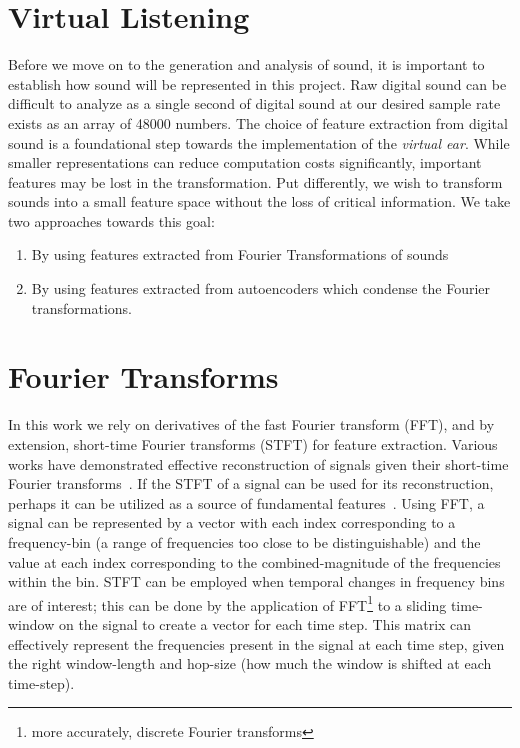 \documentclass[\main/thesis.tex]{subfiles}
\begin{document}
\section{Virtual Listening}
\label{chap:represent_sound}
Before we move on to the generation and analysis of sound, it is important to establish how sound will be represented in this project. Raw digital sound can be difficult to analyze as a single second of digital sound at our desired sample rate exists as an array of 48000 numbers. The choice of feature extraction from digital sound is a foundational step towards the implementation of the \textit{virtual ear}. While smaller representations can reduce computation costs significantly, important features may be lost in the transformation. Put differently, we wish to transform sounds into a small feature space without the loss of critical information. We take two approaches towards this goal: \begin{enumerate}
    \item By using features extracted from Fourier Transformations of sounds \item By using features extracted from autoencoders which condense the Fourier transformations. 
\end{enumerate}
\section{Fourier Transforms}
\label{sec:fourier_transforms}
In this work we rely on derivatives of the fast Fourier transform (FFT), and by extension, short-time Fourier transforms (STFT) for feature extraction. Various works have demonstrated effective reconstruction of signals given their short-time Fourier transforms~\cite{nawab1983signal,griffin1984signal}. If the STFT of a signal can be used for its reconstruction, perhaps it can be utilized as a source of fundamental features~\cite{lee2009unsupervised,huzaifah2017comparison}. Using FFT, a signal can be represented by a vector with each index corresponding to a frequency-bin (a range of frequencies too close to be distinguishable) and the value at each index corresponding to the combined-magnitude of the frequencies within the bin. STFT can be employed when temporal changes in frequency bins are of interest; this can be done by the application of FFT\footnote{more accurately, discrete Fourier transforms} to a sliding time-window on the signal to create a vector for each time step. This matrix can effectively represent the frequencies present in the signal at each time step, given the right window-length and hop-size (how much the window is shifted at each time-step). 
\end{document}

